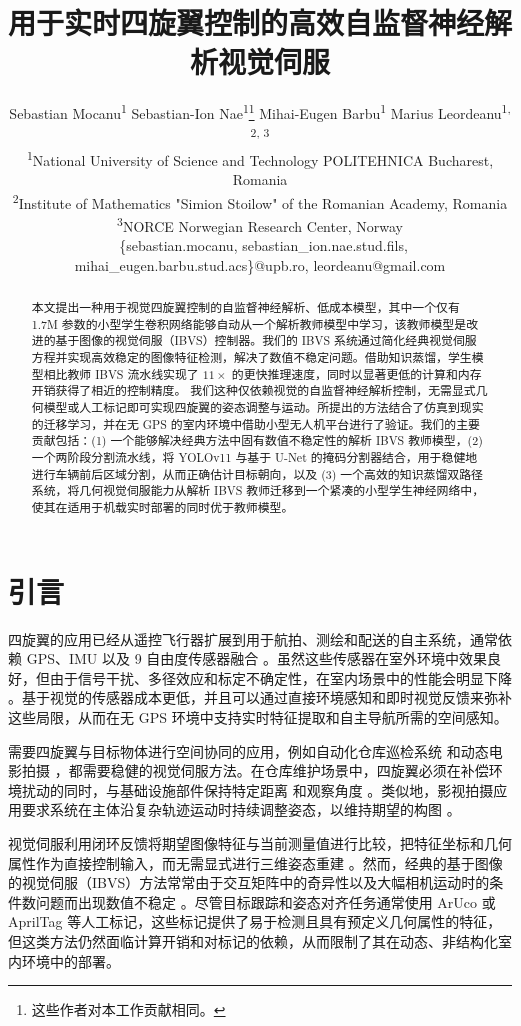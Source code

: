 \documentclass[10pt,twocolumn,letterpaper]{article}
\title{用于实时四旋翼控制的高效自监督神经解析视觉伺服}
\author{
Sebastian Mocanu\textsuperscript{1} \quad
Sebastian-Ion Nae\textsuperscript{1}\thanks{这些作者对本工作贡献相同。} \quad
Mihai-Eugen Barbu\textsuperscript{1}\footnotemark[1] \quad
Marius Leordeanu\textsuperscript{1, 2, 3} \\
\textsuperscript{1}National University of Science and Technology POLITEHNICA Bucharest, Romania \\
\textsuperscript{2}Institute of Mathematics "Simion Stoilow" of the Romanian Academy, Romania \\
\textsuperscript{3}NORCE Norwegian Research Center, Norway \\
{\footnotesize\ttfamily\ \{sebastian.mocanu, sebastian\_ion.nae.stud.fils, mihai\_eugen.barbu.stud.acs\}@upb.ro, leordeanu@gmail.com} 
}
\begin{document}
\maketitle

\begin{abstract}
本文提出一种用于视觉四旋翼控制的自监督神经解析、低成本模型，其中一个仅有 1.7M 参数的小型学生卷积网络能够自动从一个解析教师模型中学习，该教师模型是改进的基于图像的视觉伺服（IBVS）控制器。我们的 IBVS 系统通过简化经典视觉伺服方程并实现高效稳定的图像特征检测，解决了数值不稳定问题。借助知识蒸馏，学生模型相比教师 IBVS 流水线实现了 $11\times$ 的更快推理速度，同时以显著更低的计算和内存开销获得了相近的控制精度。
我们这种仅依赖视觉的自监督神经解析控制，无需显式几何模型或人工标记即可实现四旋翼的姿态调整与运动。所提出的方法结合了仿真到现实的迁移学习，并在无 GPS 的室内环境中借助小型无人机平台进行了验证。我们的主要贡献包括：(1) 一个能够解决经典方法中固有数值不稳定性的解析 IBVS 教师模型，(2) 一个两阶段分割流水线，将 YOLOv11 与基于 U-Net 的掩码分割器结合，用于稳健地进行车辆前后区域分割，从而正确估计目标朝向，以及 (3) 一个高效的知识蒸馏双路径系统，将几何视觉伺服能力从解析 IBVS 教师迁移到一个紧凑的小型学生神经网络中，使其在适用于机载实时部署的同时优于教师模型。
\end{abstract}

\section{引言}
\label{sec:intro}
四旋翼的应用已经从遥控飞行器扩展到用于航拍、测绘和配送的自主系统，通常依赖 GPS、IMU 以及 9 自由度传感器融合 \cite{arreola2018improvement}。虽然这些传感器在室外环境中效果良好，但由于信号干扰、多径效应和标定不确定性，在室内场景中的性能会明显下降 \cite{tang2024control, rebbapragada2024c2fdrone}。基于视觉的传感器成本更低，并且可以通过直接环境感知和即时视觉反馈来弥补这些局限，从而在无 GPS 环境中支持实时特征提取和自主导航所需的空间感知。

需要四旋翼与目标物体进行空间协同的应用，例如自动化仓库巡检系统 \cite{wawrla2019applications} 和动态电影拍摄 \cite{nageli2017real}，都需要稳健的视觉伺服方法。在仓库维护场景中，四旋翼必须在补偿环境扰动的同时，与基础设施部件保持特定距离 \cite{kouris2018learning} 和观察角度 \cite{wawrla2019applications}。类似地，影视拍摄应用要求系统在主体沿复杂轨迹运动时持续调整姿态，以维持期望的构图 \cite{galvane2017automated}。

视觉伺服利用闭环反馈将期望图像特征与当前测量值进行比较，把特征坐标和几何属性作为直接控制输入，而无需显式进行三维姿态重建 \cite{hutchinson1996tutorial, guenard2008practical}。然而，经典的基于图像的视觉伺服（IBVS）方法常常由于交互矩阵中的奇异性以及大幅相机运动时的条件数问题而出现数值不稳定 \cite{corke1996visual}。尽管目标跟踪和姿态对齐任务通常使用 ArUco \cite{kalaitzakis2021fiducial, mraz2020using, cruz2024performance} 或 AprilTag \cite{olson2011apriltag, zhang2017autonomous, banik2025integrating} 等人工标记，这些标记提供了易于检测且具有预定义几何属性的特征，但这类方法仍然面临计算开销和对标记的依赖，从而限制了其在动态、非结构化室内环境中的部署。
\end{document}
